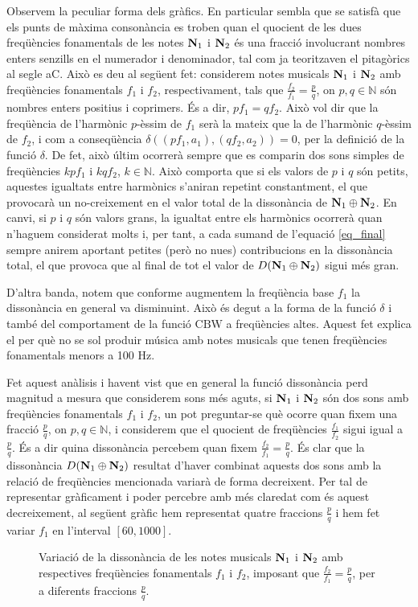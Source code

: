 \documentclass{article}
\theoremstyle{math}
\theoremstyle{TheoremNum}
\newcommand{\0}{\ensuremath{\vb{0}}}
\newcommand{\N}{\ensuremath{\vb{N}}}
\newcommand{\NN}{\ensuremath{\mathbb{N}}} %
\begin{document}
Observem la peculiar forma dels gràfics. En particular sembla que se satisfà que els punts de màxima consonància es troben quan el quocient de les dues freqüències fonamentals de les notes $\N_1$ i $\N_2$ és una fracció involucrant nombres enters senzills en el numerador i denominador, tal com ja teoritzaven el pitagòrics al segle \MakeUppercase{} aC. Això es deu al següent fet: considerem notes musicals $\N_1$ i $\N_2$ amb freqüències fonamentals $f_1$ i $f_2$, respectivament, tals que $\frac{f_2}{f_1}=\frac{p}{q}$, on $p,q\in\NN$ són nombres enters positius i coprimers. És a dir, $pf_1=qf_2$. Això vol dir que la freqüència de l'harmònic $p$-èssim de $f_1$ serà la mateix que la de l'harmònic $q$-èssim de $f_2$, i com a conseqüència $\delta((pf_1,a_1),(qf_2,a_2))=0$, per la definició de la funció $\delta$. De fet, això últim ocorrerà sempre que es comparin dos sons simples de freqüències $kpf_1$ i $kqf_2$, $k\in\NN$. Això comporta que si els valors de $p$ i $q$ són petits, aquestes igualtats entre harmònics s'aniran repetint constantment, el que provocarà un no-creixement en el valor total de la dissonància de $\N_1\oplus\N_2$. En canvi, si $p$ i $q$ són valors grans, la igualtat entre els harmònics ocorrerà quan n'haguem considerat molts i, per tant, a cada sumand de l'equació \eqref{eq_final} sempre anirem aportant petites (però no nu\lgem es) contribucions en la dissonància total, el que provoca que al final de tot el valor de $D(\N_1\oplus\N_2)$ sigui més gran.\par D'altra banda, notem que conforme augmentem la freqüència base $f_1$ la dissonància en general va disminuint. Això és degut a la forma de la funció $\delta$ i també del comportament de la funció $\text{CBW}$ a freqüències altes. Aquest fet explica el per què no se sol produir música amb notes musicals que tenen freqüències fonamentals menors a 100 Hz.\par Fet aquest anàlisis i havent vist que en general la funció dissonància perd magnitud a mesura que considerem sons més aguts, si $\N_1$ i $\N_2$ són dos sons amb freqüències fonamentals $f_1$ i $f_2$, un pot preguntar-se què ocorre quan fixem una fracció $\frac{p}{q}$, on $p,q\in\NN$, i considerem que el quocient de freqüències $\frac{f_1}{f_2}$ sigui igual a $\frac{p}{q}$. És a dir quina dissonància percebem quan fixem $\frac{f_2}{f_1}=\frac{p}{q}$. És clar que la dissonància $D(\N_1\oplus\N_2)$ resultat d'haver combinat aquests dos sons amb la relació de freqüències mencionada variarà de forma decreixent. Per tal de representar gràficament i poder percebre amb més claredat com és aquest decreixement, al següent gràfic hem representat quatre fraccions $\frac{p}{q}$ i hem fet variar $f_1$ en l'interval $[60,1000]$.
\begin{figure}[ht]
    \centering
    
    \caption{Variació de la dissonància de les notes musicals $\N_1$ i $\N_2$ amb respectives freqüències fonamentals $f_1$ i $f_2$, imposant que $\frac{f_2}{f_1}=\frac{p}{q}$, per a diferents fraccions $\frac{p}{q}$.}
\end{figure}
\end{document}
